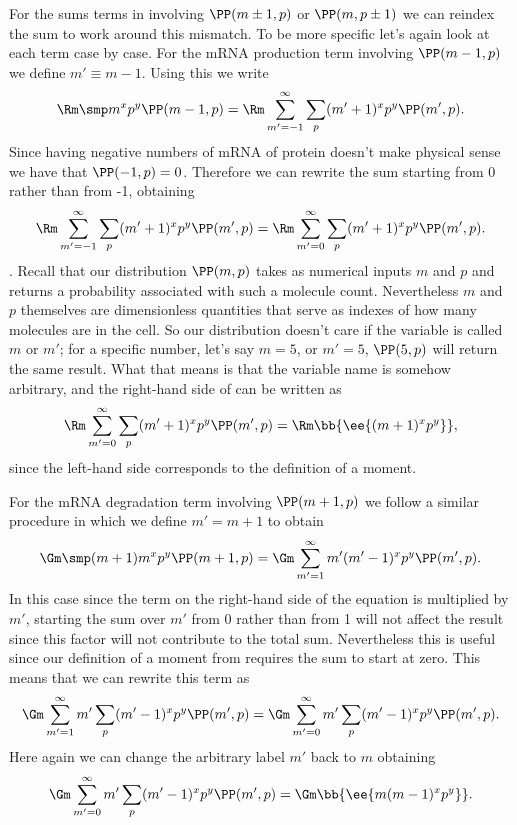 For the sums terms in  involving $\PP(m \pm 1, p)$ or
$\PP(m, p \pm 1)$ we can reindex the sum to work around this mismatch. To be
more specific let's again look at each term case by case. For the mRNA
production term involving $\PP(m-1, p)$ we define $m' \equiv m - 1$. Using this
we write
\begin{equation}
  \Rm \smp m^x p^y \PP(m-1, p) =
  \Rm \sum_{m' = -1}^\infty \sum_p (m' + 1)^x p^y \PP(m', p).
\end{equation}
Since having negative numbers of mRNA of protein doesn't make physical sense
we have that $\PP(-1, p) = 0$. Therefore we can rewrite the sum starting from 0
rather than from -1, obtaining
\begin{equation}
  \Rm \sum_{m' = -1}^\infty \sum_p (m' + 1)^x p^y \PP(m', p) =
  \Rm \sum_{m'=0}^\infty \sum_p (m' + 1)^x p^y \PP(m', p).
  \label{eq_reindex}
\end{equation}
.
Recall that our distribution $\PP(m, p)$ takes as numerical inputs $m$ and $p$
and returns a probability associated with such a molecule count.  Nevertheless
$m$ and $p$ themselves are dimensionless quantities that serve as indexes of how
many molecules are in the cell. So our distribution doesn't care if the variable
is called $m$ or $m'$; for a specific number, let's say $m = 5$, or $m' = 5$,
$\PP(5, p)$ will return the same result. What that means is that the variable
name is somehow arbitrary, and the right-hand side of  can be
written as
\begin{equation}
  \Rm \sum_{m'=0}^\infty \sum_p (m' + 1)^x p^y \PP(m', p) =
  \Rm \bb{\ee{(m+1)^x p^y}},
\end{equation}
since the left-hand side corresponds to the definition of a moment.

For the mRNA degradation term involving $\PP(m + 1, p)$ we follow a similar
procedure in which we define $m' = m + 1$ to obtain
\begin{equation}
  \Gm \smp (m + 1) m^x p^y \PP(m + 1, p) =
  \Gm \sum_{m' = 1}^\infty m' (m' - 1)^x p^y \PP(m', p).
\end{equation}
In this case since the term on the right-hand side of the equation is multiplied
by $m'$, starting the sum over $m'$ from 0 rather than from 1 will not affect
the result since this factor will not contribute to the total sum. Nevertheless
this is useful since our definition of a moment from  requires
the sum to start at zero. This means that we can rewrite this term as
\begin{equation}
  \Gm \sum_{m' = 1}^\infty m' \sum_p (m' - 1)^x p^y \PP(m', p) =
  \Gm \sum_{m' = 0}^\infty m' \sum_p (m' - 1)^x p^y \PP(m', p).
\end{equation}
Here again we can change the arbitrary label $m'$ back to $m$ obtaining
\begin{equation}
  \Gm \sum_{m' = 0}^\infty m' \sum_p (m' - 1)^x p^y \PP(m', p) =
  \Gm \bb{\ee{m (m - 1)^x p^y}}.
\end{equation}

